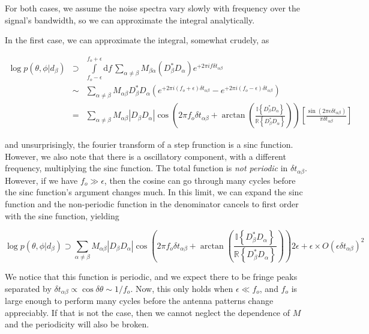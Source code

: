 \documentclass[10pt]{article}
\begin{document}
For both cases, we assume the noise spectra vary slowly with frequency over the signal's bandwidth, so we can approximate the integral analytically.

In the first case, we can approximate the integral, somewhat crudely, as

\begin{eqnarray}
\log p(\theta,\phi|d_\beta) & \supset & \int\limits_{f_o-\epsilon}^{f_o+\epsilon}\mathrm{d}f\,\sum\limits_{\alpha\neq\beta} M_{\beta\alpha} \left(D_\beta^\ast D_\alpha \right)e^{+2\pi i f \delta t_{\alpha\beta}} \\
& \sim & \sum\limits_{\alpha\neq\beta} M_{\alpha\beta} D_\beta^\ast D_\alpha \left(e^{+2\pi i (f_o+\epsilon) \delta t_{\alpha\beta}} - e^{+2\pi i (f_o-\epsilon) \delta t_{\alpha\beta}}\right) \\
& = & \sum\limits_{\alpha\neq\beta} M_{\alpha\beta} \left|D_\beta D_\alpha\right| \cos\left( 2\pi f_o \delta t_{\alpha\beta} + \arctan\left(\frac{\mathbb{I}\left\{D_\beta^\ast D_\alpha\right\}}{\mathbb{R}\left\{D_\beta^\ast D_\alpha\right\}}\right) \right)\left[\frac{\sin\left(2\pi\epsilon\delta t_{\alpha\beta}\right)}{\pi\delta t_{\alpha\beta}}\right]
\end{eqnarray}

and unsurprisingly, the fourier transform of a step frunction is a sinc function. However, we also note that there is a oscillatory component, with a different frequency, multiplying the sinc function. The total function is \emph{not periodic} in $\delta t_{\alpha\beta}$. However, if we have $f_o \gg \epsilon$, then the cosine can go through many cycles before the sinc function's argument changes much. In this limit, we can expand the sinc function and the non-periodic function in the denominator cancels to first order with the sine function, yielding

\begin{equation}
\log p(\theta,\phi|d_\beta) \supset \sum\limits_{\alpha\neq\beta} M_{\alpha\beta} \left|D_\beta D_\alpha\right| \cos\left( 2\pi f_o \delta t_{\alpha\beta} + \arctan\left(\frac{\mathbb{I}\left\{D_\beta^\ast D_\alpha\right\}}{\mathbb{R}\left\{D_\beta^\ast D_\alpha\right\}}\right) \right) 2\epsilon + \epsilon \times O(\epsilon\delta t_{\alpha\beta})^2
\end{equation}

We notice that this function is periodic, and we expect there to be fringe peaks separated by $\delta t_{\alpha\beta} \propto \cos\delta\theta \sim 1/f_o$. Now, this only holds when $\epsilon \ll f_o$, and $f_o$ is large enough to perform many cycles before the antenna patterns change appreciably. If that is not the case, then we cannot neglect the dependence of $M$ and the periodicity will also be broken.
\end{document}
